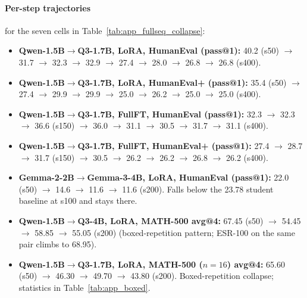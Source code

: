 \documentclass{article}
\newcommand{\method}{ESR}
\begin{document}
\paragraph{Per-step trajectories} for the seven cells in Table~\ref{tab:app_fullseq_collapse}:

\begin{itemize}
\item \textbf{Qwen-1.5B$\rightarrow$Q3-1.7B, LoRA, HumanEval (pass@1):}
40.2 (s50) $\rightarrow$ 31.7 $\rightarrow$ 32.3 $\rightarrow$ 32.9 $\rightarrow$ 27.4 $\rightarrow$ 28.0 $\rightarrow$ 26.8 $\rightarrow$ 26.8 (s400).
\item \textbf{Qwen-1.5B$\rightarrow$Q3-1.7B, LoRA, HumanEval+ (pass@1):}
35.4 (s50) $\rightarrow$ 27.4 $\rightarrow$ 29.9 $\rightarrow$ 29.9 $\rightarrow$ 25.0 $\rightarrow$ 26.2 $\rightarrow$ 25.0 $\rightarrow$ 25.0 (s400).
\item \textbf{Qwen-1.5B$\rightarrow$Q3-1.7B, FullFT, HumanEval (pass@1):}
32.3 $\rightarrow$ 32.3 $\rightarrow$ 36.6 (s150) $\rightarrow$ 36.0 $\rightarrow$ 31.1 $\rightarrow$ 30.5 $\rightarrow$ 31.7 $\rightarrow$ 31.1 (s400).
\item \textbf{Qwen-1.5B$\rightarrow$Q3-1.7B, FullFT, HumanEval+ (pass@1):}
27.4 $\rightarrow$ 28.7 $\rightarrow$ 31.7 (s150) $\rightarrow$ 30.5 $\rightarrow$ 26.2 $\rightarrow$ 26.2 $\rightarrow$ 26.8 $\rightarrow$ 26.2 (s400).
\item \textbf{Gemma-2-2B$\rightarrow$Gemma-3-4B, LoRA, HumanEval (pass@1):}
22.0 (s50) $\rightarrow$ 14.6 $\rightarrow$ 11.6 $\rightarrow$ 11.6 (s200). Falls below the 23.78 student baseline at s100 and stays there.
\item \textbf{Qwen-1.5B$\rightarrow$Q3-4B, LoRA, MATH-500 avg@4:}
67.45 (s50) $\rightarrow$ 54.45 $\rightarrow$ 58.85 $\rightarrow$ 55.05 (s200) (boxed-repetition pattern; \method{}-100 on the same pair climbs to 68.95).
\item \textbf{Qwen-1.5B$\rightarrow$Q3-1.7B, LoRA, MATH-500 ($n{=}16$) avg@4:}
65.60 (s50) $\rightarrow$ 46.30 $\rightarrow$ 49.70 $\rightarrow$ 43.80 (s200). Boxed-repetition collapse; statistics in Table~\ref{tab:app_boxed}.
\end{itemize}
\end{document}
